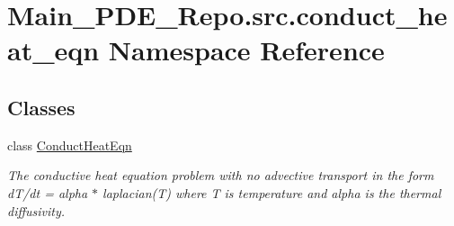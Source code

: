 \hypertarget{namespaceMain__PDE__Repo_1_1src_1_1conduct__heat__eqn}{}\section{Main\+\_\+\+P\+D\+E\+\_\+\+Repo.\+src.\+conduct\+\_\+heat\+\_\+eqn Namespace Reference}
\label{namespaceMain__PDE__Repo_1_1src_1_1conduct__heat__eqn}
\subsection*{Classes}
\begin{DoxyCompactItemize}
\item 
class \hyperlink{classMain__PDE__Repo_1_1src_1_1conduct__heat__eqn_1_1ConductHeatEqn}{Conduct\+Heat\+Eqn}
\begin{DoxyCompactList}\small\item\em The conductive heat equation problem with no advective transport in the form d\+T/dt = alpha $\ast$ laplacian(\+T) where T is temperature and alpha is the thermal diffusivity. \end{DoxyCompactList}\end{DoxyCompactItemize}
